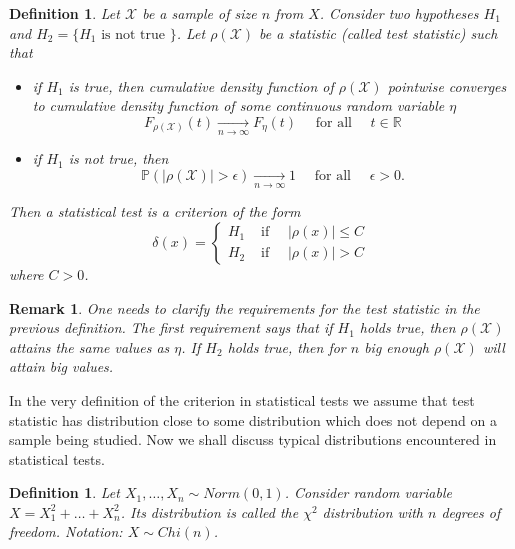 \documentclass[12pt]{article}
\newtheorem{remark}[theorem]{Remark}
\newtheorem{definition}[theorem]{Definition}
\begin{document}
\begin{definition} Let $\mathscr{X}$ be a sample of size $n$ from $X$. Consider
    two hypotheses $H_1$ and $H_2=\{H_1\mbox{ is not true }\}$. Let
    $\rho(\mathscr{X})$ be a statistic (called test statistic) such that
    \begin{itemize}
        \item if $H_1$ is true, then cumulative density function of
              $\rho(\mathscr{X})$ pointwise converges to cumulative density
              function of some continuous random variable $\eta$
              $$
                  F_{\rho(\mathscr{X})}(t)\underset{n\to\infty}{\to}F_{\eta}(t)
                  \quad\mbox{ for all }\quad t\in\mathbb{R}
              $$
        \item if $H_1$ is not true, then
              $$
                  \mathbb{P}(|\rho(\mathscr{X})|>\epsilon)
                  \underset{n\to\infty}{\to} 1
                  \quad\mbox{ for all }\quad \epsilon>0.
              $$
    \end{itemize}
    Then a statistical test is a criterion of the form
    $$
        \delta(x)=
        \begin{cases}
            H_1 & \mbox{ if }\quad |\rho(x)|\leq C \\
            H_2 & \mbox{ if }\quad |\rho(x)|> C
        \end{cases}
    $$
    where $C>0$.
\end{definition}

\begin{remark} One needs to clarify the requirements for the test statistic 
    in the previous definition. The first requirement says that if $H_1$ holds 
    true, then $\rho(\mathscr{X})$ attains the same values as $\eta$. 
    If $H_2$ holds true, then for $n$ big enough $\rho(\mathscr{X})$ will 
    attain big values.
\end{remark}

In the very definition of the criterion in statistical tests we assume that test
statistic has distribution close to some distribution which does not depend on a
sample being studied. Now we shall discuss typical distributions encountered in
statistical tests.

\begin{definition} Let $X_1,\ldots,X_n\sim Norm(0, 1)$. Consider random variable
    $X=X_1^2+\ldots+X_n^2$.  %
    Its distribution is called the $\chi^2$ distribution
    with $n$ degrees of freedom. Notation: $X\sim Chi(n)$.
\end{definition}
\end{document}
